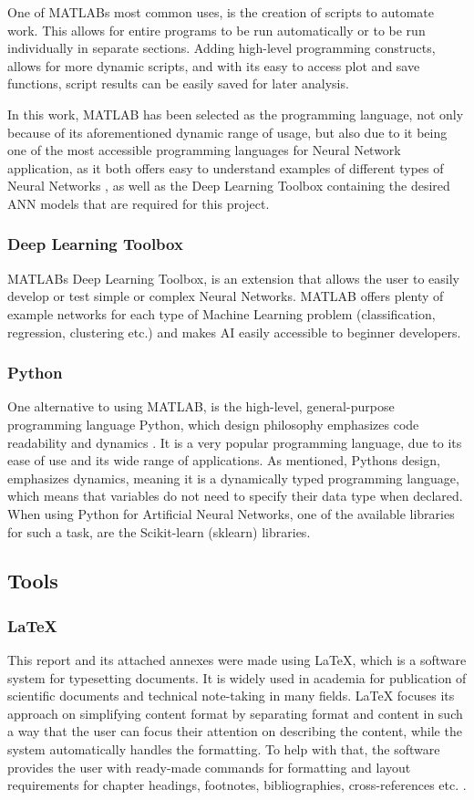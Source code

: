 One of MATLABs most common uses, is the creation of scripts to automate work. This allows for entire programs to be run automatically or to be run individually in separate sections. Adding high-level programming constructs, allows for more dynamic scripts, and with its easy to access plot and save functions, script results can be easily saved for later analysis. 

In this work, MATLAB has been selected as the programming language, not only because of its aforementioned dynamic range of usage, but also due to it being one of the most accessible programming languages for Neural Network application, as it both offers easy to understand examples of different types of Neural Networks \cite{mathworks:ANNs}, as well as the Deep Learning Toolbox containing the desired ANN models that are required for this project.

\subsubsection{Deep Learning Toolbox}
MATLABs Deep Learning Toolbox, is an extension that allows the user to easily develop or test simple or complex Neural Networks. MATLAB offers plenty of example networks for each type of Machine Learning problem (classification, regression, clustering etc.) and makes AI easily accessible to beginner developers. 

\subsubsection{Python}
One alternative to using MATLAB, is the high-level, general-purpose programming language Python, which design philosophy emphasizes code readability and dynamics \cite{python:wiki}. It is a very popular programming language, due to its ease of use and its wide range of applications. As mentioned, Pythons design, emphasizes dynamics, meaning it is a dynamically typed programming language, which means that variables do not need to specify their data type when declared. When using Python for Artificial Neural Networks, one of the available libraries for such a task, are the Scikit-learn (sklearn) libraries.

\subsection{Tools}
\subsubsection{LaTeX}
This report and its attached annexes were made using LaTeX, which is a software system for typesetting documents. It is widely used in academia for publication of scientific documents and technical note-taking in many fields. LaTeX focuses its approach on simplifying content format by separating format and content in such a way that the user can focus their attention on describing the content, while the system automatically handles the formatting. To help with that, the software provides the user with ready-made commands for formatting and layout requirements for chapter headings, footnotes, bibliographies, cross-references etc. \cite{latex:wiki}.

